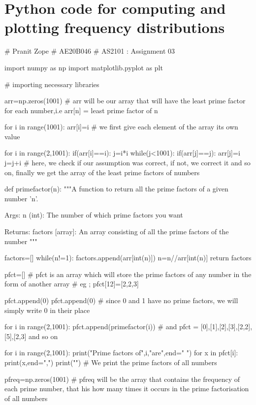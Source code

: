 \documentclass[12pt]{article}
\begin{document}
\section{Python code for computing and plotting frequency distributions}
\begin{python}
# Pranit Zope
# AE20B046
# AS2101 : Assignment 03

import numpy as np
import matplotlib.pyplot as plt

# importing necessary libraries


arr=np.zeros(1001)  # arr will be our array that will have the least prime factor for each number,i.e arr[n] = least prime factor of n

for i in range(1001):
    arr[i]=i
# we first give each element of the array its own value

for i in range(2,1001):
    if(arr[i]==i):
        j=i*i
        while(j<1001):
            if(arr[j]==j):
                arr[j]=i
            j=j+i
# here, we check if our assumption was correct, if not, we correct it and so on, finally we get the array of the least prime factors of numbers


def primefactor(n):
    """A function to return all the prime factors of a given number 'n'.

    Args:
        n (int): The number of which prime factors you want

    Returns:
        factors [array]: An array consisting of all the prime factors of the number
    """

    factors=[]            
    while(n!=1):
        factors.append(arr[int(n)])
        n=n//arr[int(n)]
    return factors



pfct=[] # pfct is an array which will store the prime factors of any number in the form of another array
# eg ; pfct[12]=[2,2,3]

pfct.append(0)
pfct.append(0)
# since 0 and 1 have no prime factors, we will simply write 0 in their place


for i in range(2,1001):
    pfct.append(primefactor(i))
# and pfct = [0],[1],[2],[3],[2,2],[5],[2,3] and so on

for i in range(2,1001):
    print("Prime factors of",i,"are",end=" ")
    for x in pfct[i]:
        print(x,end=",")
    print("\n")
# We print the prime factors of all numbers

pfreq=np.zeros(1001) # pfreq will be the array that contains the frequency of each prime number,  that his how many times it occurs in the prime factorisation of all numbers


\end{python}
\end{document}
